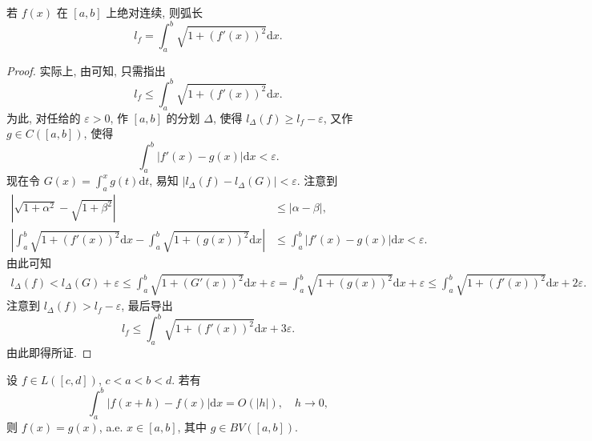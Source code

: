 \documentclass[../../main.tex]{subfiles}%
\begin{document}
\begin{example}
若 $f(x)$ 在 $[a,b]$ 上绝对连续, 则弧长
\[
l_f = \int_a^b \sqrt{1+(f'(x))^2}\mathrm{d}x.
\]
\end{example}
\begin{proof}

实际上, 由可知, 只需指出
\[
l_f \leqslant \int_a^b \sqrt{1+(f'(x))^2}\mathrm{d}x.
\]
为此, 对任给的 $\varepsilon>0$, 作 $[a,b]$ 的分划 $\Delta$, 使得 $l_\Delta(f)\geqslant l_f-\varepsilon$, 又作 $g\in C([a,b])$, 使得
\[
\int_a^b |f'(x)-g(x)|\mathrm{d}x < \varepsilon.
\]
现在令 $G(x) = \int_a^x g(t)\mathrm{d}t$, 易知 $|l_\Delta(f)-l_\Delta(G)| < \varepsilon$. 注意到
\begin{align*}
|\sqrt{1+\alpha^2}-\sqrt{1+\beta^2}| &\leqslant |\alpha-\beta|, \\
\left|\int_a^b \sqrt{1+(f'(x))^2}\mathrm{d}x - \int_a^b \sqrt{1+(g(x))^2}\mathrm{d}x\right|
&\leqslant \int_a^b |f'(x)-g(x)|\mathrm{d}x < \varepsilon.
\end{align*}
由此可知
\begin{align*}
l_\Delta(f) < l_\Delta(G) + \varepsilon \leqslant \int_a^b \sqrt{1+(G'(x))^2}\mathrm{d}x + \varepsilon 
= \int_a^b \sqrt{1+(g(x))^2}\mathrm{d}x + \varepsilon \leqslant \int_a^b \sqrt{1+(f'(x))^2}\mathrm{d}x + 2\varepsilon.
\end{align*}
注意到 $l_\Delta(f) > l_f-\varepsilon$, 最后导出
\[
l_f \leqslant \int_a^b \sqrt{1+(f'(x))^2}\mathrm{d}x + 3\varepsilon.
\]
由此即得所证.

\end{proof}

\begin{example}
设 $f\in L([c,d])$, $c<a<b<d$. 若有
\[
\int_a^b |f(x+h)-f(x)|\mathrm{d}x = O(|h|),\quad h\to 0,
\]
则 $f(x)=g(x)$, a.e. $x\in[a,b]$, 其中 $g\in  BV([a,b])$.
\end{example}
\end{document}
